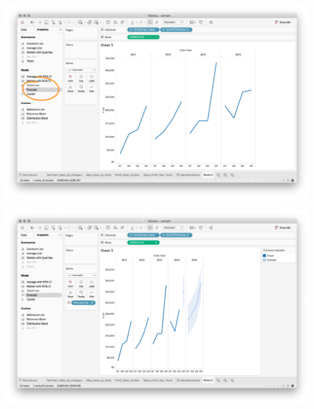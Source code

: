 \documentclass[xcolor=svgnames]{beamer} %
\begin{document}
\begin{frame}
\begin{center}
\includegraphics[width=.99\textwidth]{img/forecast1}
\end{center}
\end{frame}

\begin{frame}
\begin{center}
\includegraphics[width=.99\textwidth]{img/forecast2}
\end{center}
\end{frame}
\end{document}
